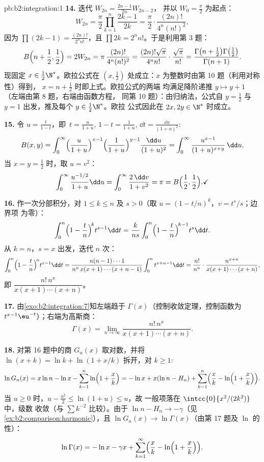\begin{solution}{pb:b2:integration:1}
\textbf{14.} 迭代 $W_{2n} = \frac{2n-1}{2n}W_{2n-2}$，
并以 $W_0 = \frac\pi2$ 为起点：
\[
W_{2n} = \frac\pi2\prod_{k=1}^{n}\frac{2k-1}{2k}
= \frac\pi2\cdot\frac{(2n)!}{4^n(n!)^2},
\]
因为 $\prod(2k-1) = \frac{(2n)!}{2^n n!}$，且 $\prod 2k = 2^n
n!$。于是利用第 3 题：
\[
B\Bigl(n+\frac12, \frac12\Bigr) = 2W_{2n}
= \pi\,\frac{(2n)!}{4^n(n!)^2}
= \frac{(2n)!\sqrt\pi}{4^n n!}\cdot\frac{\sqrt\pi}{n!}
= \frac{\Gamma\bigl(n+\frac12\bigr)\Gamma\bigl(\frac12\bigr)}
{\Gamma(n+1)} .
\]
现固定 $x \in \frac12\N^*$。欧拉公式在 $(x,
\frac12)$ 处成立：$x$ 为整数时由第 10 题（利用对称性）得到，
$x = n + \frac12$ 时即上式。欧拉公式的两端
均满足降阶递推 $y \mapsto y + 1$
（左端由第 8 题，右端由函数方程，
同第 10 题）：由归纳法，公式自 $y =
\frac12$ 与 $y = 1$ 出发，推及每个 $y \in \frac12\N^*$。欧拉
公式因此在 $2x, 2y \in \N^*$ 时成立。

\textbf{15.} 令 $u = \frac{t}{1-t}$，即\ $t =
\frac{u}{1+u}$, $1 - t = \frac{1}{1+u}$, $\dd t =
\frac{\dd u}{(1+u)^2}$:
\[
B(x,y) = \int_0^\infty
\Bigl(\frac{u}{1+u}\Bigr)^{x-1}
\Bigl(\frac{1}{1+u}\Bigr)^{y-1}
\frac{\dd u}{(1+u)^2}
= \int_0^\infty \frac{u^{x-1}}{(1+u)^{x+y}}\,\dd u .
\]
当 $x = y = \frac12$ 时，取 $u = v^2$：
\[
\int_0^\infty \frac{u^{-1/2}}{1+u}\dd u
= \int_0^\infty \frac{2\,\dd v}{1+v^2} = \pi
= B\Bigl(\frac12,\frac12\Bigr) . \checkmark
\]

\textbf{16.} 作一次分部积分，对 $1 \leq k \leq n$
及 $s > 0$（取 $u = (1 - t/n)^k$，$v = t^s/s$；边界项
为零）：
\[
\int_0^n \Bigl(1-\frac tn\Bigr)^{\!k} t^{s-1}\dd t
= \frac{k}{ns}\int_0^n \Bigl(1-\frac tn\Bigr)^{\!k-1}
t^{s}\dd t .
\]
从 $k = n$，$s = x$ 出发，迭代 $n$ 次：
\[
\int_0^n \Bigl(1-\frac tn\Bigr)^{\!n} t^{x-1}\dd t
= \frac{n(n-1)\cdots1}{n^n\,x(x+1)\cdots(x+n-1)}
\int_0^n t^{x+n-1}\dd t
= \frac{n!}{n^n}\cdot
\frac{n^{x+n}}{x(x+1)\cdots(x+n)} ,
\]
即 $\dfrac{n!\,n^x}{x(x+1)\cdots(x+n)}$。

\textbf{17.} 由\cref{exo:b2:integration:7}知左端趋于
$\Gamma(x)$（控制收敛定理，控制函数为
$t^{x-1}\eu^{-t}$）；右端为高斯商：
\[
\Gamma(x) = \lim_{n\to\infty}
\frac{n!\,n^x}{x(x+1)\cdots(x+n)} .
\]

\textbf{18.} 对第 16 题中的商
$G_n(x)$ 取对数，并将 $\ln(x+k) = \ln k + \ln(1 + x/k)$ 拆开，对 $k
\geq 1$:
\[
\ln G_n(x) = x\ln n - \ln x - \sum_{k=1}^n
\ln\Bigl(1+\frac xk\Bigr)
= -\ln x + x(\ln n - H_n)
+ \sum_{k=1}^n\Bigl(\frac xk -
\ln\Bigl(1+\frac xk\Bigr)\Bigr).
\]
当 $u \geq 0$ 时，$u - \frac{u^2}2 \leq \ln(1+u) \leq u$，故
一般项落在 $\intcc{0}{x^2/(2k^2)}$ 中，级数
收敛（与 $\sum k^{-2}$ 比较）。由于 $\ln n - H_n
\to -\gamma$（见\cref{ex:b2:comparison:harmonic}），且 $\ln G_n(x)
\to \ln\Gamma(x)$（由第 17 题及 $\ln$ 的性）：
\[
\ln\Gamma(x) = -\ln x - \gamma x
+ \sum_{k=1}^\infty\Bigl(\frac xk -
\ln\Bigl(1+\frac xk\Bigr)\Bigr) .
\]


\end{solution}
